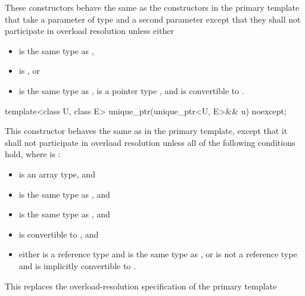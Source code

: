 \begin{itemdescr}
\pnum
These constructors behave the same as
the constructors in the primary template that
take a parameter of type  and a second parameter
except that they
shall not participate in overload resolution unless either

\begin{itemize}
\item {} is the same type as ,
\item {} is , or
\item {} is the same type as ,
       is a pointer type , and
       is convertible to .
\end{itemize}
\end{itemdescr}

%
\begin{itemdecl}
template<class U, class E> unique_ptr(unique_ptr<U, E>&& u) noexcept;
\end{itemdecl}

\begin{itemdescr}
\pnum
This constructor behaves the same as in the primary template,
except that it shall not participate in overload resolution
unless all of the following conditions hold,
where  is :

\begin{itemize}
\item {} is an array type, and
\item {} is the same type as , and
\item {} is the same type as , and
\item {} is convertible to , and
\item either  is a reference type and  is the same type as ,
      or  is not a reference type and  is implicitly convertible to .
\end{itemize}

\begin{note}
This replaces the overload-resolution specification of the primary template
\end{note}
\end{itemdescr}

